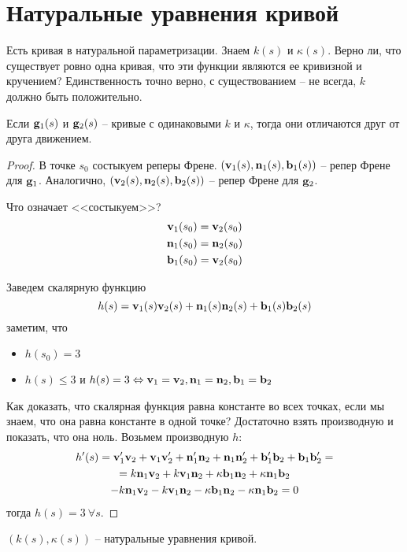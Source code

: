\documentclass[main]{subfiles}
\begin{document}
\section{Натуральные уравнения кривой}

Есть кривая в натуральной параметризации.
Знаем $k(s)$ и $\kappa(s)$.
Верно ли, что существует ровно одна кривая, что эти функции являются ее кривизной и кручением?
Единственность точно верно, с существованием -- не всегда, $k$ должно быть положительно.

\begin{theorem}
    Если $\mathbf{g}_1(s)$ и $\mathbf{g}_2(s)$ -- кривые с одинаковыми $k$ и $\kappa$, тогда они отличаются друг от друга движением.
\end{theorem}
\begin{proof}
    В точке $s_0$ состыкуем реперы Френе.
    $(\mathbf{v}_1(s), \mathbf{n}_1(s), \mathbf{b}_1(s))$ -- репер Френе для $\mathbf{g}_1$.
    Аналогично, $(\mathbf{v}_2(s), \mathbf{n}_2(s), \mathbf{b}_2(s))$ -- репер Френе для $\mathbf{g}_2$.

    Что означает <<состыкуем>>?
    \begin{gather*}
        \mathbf{v}_1 (s_0) = \mathbf{v}_2(s_0)\\
        \mathbf{n}_1 (s_0) = \mathbf{n}_2(s_0)\\
        \mathbf{b}_1 (s_0) = \mathbf{v}_2(s_0)
    \end{gather*}

    Заведем скалярную функцию
    \[h(s) = \mathbf{v}_1(s) \mathbf{v}_2(s) + \mathbf{n}_1(s) \mathbf{n}_2(s) + \mathbf{b}_1(s) \mathbf{b}_2(s)\]
    заметим, что
    \begin{itemize}
        \item $h(s_0) = 3$
        \item $h(s) \le 3$ и $h(s) = 3 \Leftrightarrow \mathbf{v}_1 = \mathbf{v}_2, \mathbf{n}_1 = \mathbf{n}_2, \mathbf{b}_1 = \mathbf{b}_2$
    \end{itemize}
    Как доказать, что скалярная функция равна константе во всех точках, если мы знаем, что она равна константе в одной точке?
    Достаточно взять производную и показать, что она ноль.
    Возьмем производную $h$:
    \begin{multline*}
        h'(s) = \mathbf{v}_1' \mathbf{v}_2 + \mathbf{v}_1 \mathbf{v}_2' + \mathbf{n}_1' \mathbf{n}_2 + \mathbf{n}_1 \mathbf{n}_2' + \mathbf{b}_1' \mathbf{b}_2 + \mathbf{b}_1 \mathbf{b}_2' = \\
        = k \mathbf{n}_1 \mathbf{v}_2 + k \mathbf{v}_1 \mathbf{n}_2  + \kappa \mathbf{b}_1 \mathbf{n}_2 + \kappa \mathbf{n}_1 \mathbf{b}_2\\
        - k \mathbf{n}_1 \mathbf{v}_2 - k \mathbf{v}_1 \mathbf{n}_2  - \kappa \mathbf{b}_1 \mathbf{n}_2 - \kappa \mathbf{n}_1 \mathbf{b}_2 = 0
    \end{multline*}
    тогда $h(s) = 3 \ \forall s$.
\end{proof}
\begin{definition}
    $(k(s), \kappa(s))$ -- натуральные уравнения кривой.
\end{definition}
\end{document}
